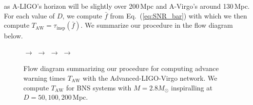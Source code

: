 \documentclass[prd,amsmath,amssymb,aps,floats,amsfonts,notitlepage,superscriptaddress,eqsecnum,nofootinbib,10pt]{revtex4-1}
\begin{document}
 as A-LIGO's horizon will be slightly over 200\,Mpc and A-Virgo's around 130\,Mpc.
 For each value of $D$, we compute $\bar{f}$ from Eq.~(\ref{eq:SNR_bar}) with which we then compute $T_\text{AW}=\tau_\text{insp}(\bar{f})$.
 We summarize our procedure in the flow diagram below.
  \begin{figure}[ht!]
 $\longrightarrow$ 
 $\longrightarrow$   $\longrightarrow$  
 $\longrightarrow$  
  \caption{Flow diagram summarizing our procedure for computing advance warning times $T_\text{AW}$ with the Advanced-LIGO-Virgo network. 
  We compute $T_\text{AW}$ for BNS systems with $M=2.8M_\odot$ inspiralling at $D=50,100,200\,$Mpc. 
  }\label{fig:flow}
\end{figure}
\end{document}
